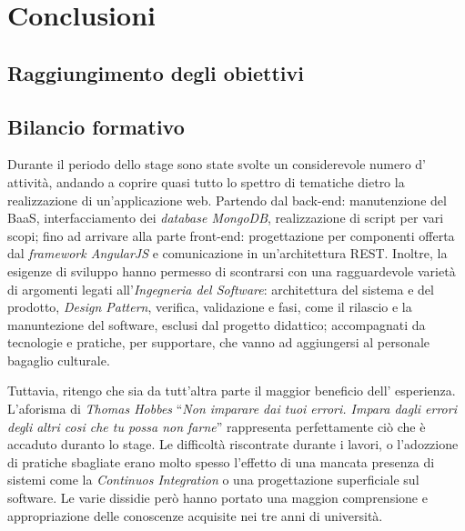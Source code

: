 \chapter{Conclusioni}
\label{cap:conclusioni}
\section{Raggiungimento degli obiettivi}


\section{Bilancio formativo}
Durante il periodo dello stage sono state svolte un considerevole numero d'
attività, andando a coprire quasi tutto lo spettro di tematiche dietro la
realizzazione di un'applicazione web. Partendo dal \gls{back-end}: manutenzione
del \gls{BaaS}, interfacciamento dei \textit{database MongoDB}, realizzazione di
script per vari scopi; fino ad arrivare alla parte \gls{front-end}: 
progettazione per componenti offerta dal \textit{framework AngularJS} e
comunicazione in un'architettura \gls{REST}. Inoltre, la esigenze di sviluppo
hanno permesso di scontrarsi con una ragguardevole varietà di argomenti legati
all'\textit{Ingegneria del Software}: architettura del sistema e del prodotto, 
\textit{Design Pattern}, verifica, validazione e fasi, come il rilascio
e la manuntezione del software, esclusi dal progetto didattico; accompagnati
da tecnologie e pratiche, per supportare, che vanno ad aggiungersi al personale
bagaglio culturale.

Tuttavia, ritengo che sia da tutt'altra parte il maggior beneficio dell'
esperienza. L'aforisma di \textit{Thomas Hobbes} ``\textit{Non imparare dai tuoi
errori. Impara dagli errori degli altri cosi che tu possa non farne}'' 
rappresenta perfettamente ciò che è accaduto duranto lo stage. Le difficoltà 
riscontrate durante i lavori, o l'adozzione di pratiche sbagliate erano molto 
spesso l'effetto di una mancata presenza di sistemi come la \textit{Continuos
Integration} o una progettazione superficiale sul software. Le varie dissidie
però hanno portato una maggion comprensione e appropriazione delle conoscenze
acquisite nei tre anni di università.







